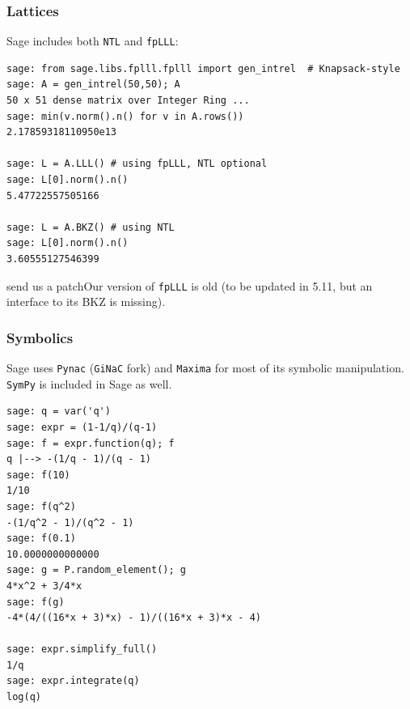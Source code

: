 \documentclass[9pt]{beamer}
\newcommand{\patchit}[1]{\begin{block}{send us a patch}#1\end{block}}
\begin{document}
\begin{frame}[fragile]
\frametitle{Lattices}
Sage includes both \texttt{NTL} and \texttt{fpLLL}:

\begin{lstlisting}
sage: from sage.libs.fplll.fplll import gen_intrel  # Knapsack-style
sage: A = gen_intrel(50,50); A
50 x 51 dense matrix over Integer Ring ...
sage: min(v.norm().n() for v in A.rows())
2.17859318110950e13

sage: L = A.LLL() # using fpLLL, NTL optional
sage: L[0].norm().n()
5.47722557505166

sage: L = A.BKZ() # using NTL
sage: L[0].norm().n()
3.60555127546399
\end{lstlisting}

\patchit{Our version of \texttt{fpLLL} is old (to be updated in 5.11, but an interface to its BKZ is missing).}


\end{frame}

\begin{frame}[fragile]
\frametitle{Symbolics}
Sage uses {\tt Pynac} ({\tt GiNaC} fork) and {\tt Maxima} for most of its symbolic manipulation. {\tt SymPy} is included in Sage as well.

\begin{lstlisting}
sage: q = var('q')
sage: expr = (1-1/q)/(q-1)
sage: f = expr.function(q); f
q |--> -(1/q - 1)/(q - 1)
sage: f(10)
1/10
sage: f(q^2)
-(1/q^2 - 1)/(q^2 - 1)
sage: f(0.1)
10.0000000000000
sage: g = P.random_element(); g
4*x^2 + 3/4*x
sage: f(g)
-4*(4/((16*x + 3)*x) - 1)/((16*x + 3)*x - 4)

sage: expr.simplify_full()
1/q
sage: expr.integrate(q)
log(q)
\end{lstlisting}
\end{frame}
\end{document}
